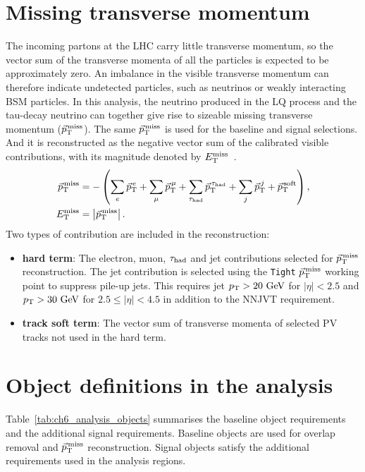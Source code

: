 \section{Missing transverse momentum}
\label{sec:ch6_met}

The incoming partons at the LHC carry little transverse momentum, so the vector sum of the transverse momenta of all the particles is expected to be approximately zero.
An imbalance in the visible transverse momentum can therefore indicate undetected particles, such as neutrinos or weakly interacting BSM particles.
In this analysis, the neutrino produced in the LQ process and the tau-decay neutrino can together give rise to sizeable missing transverse momentum ($\vec p_{\mathrm{T}}^{\,\mathrm{miss}}$). The same $\vec p_{\mathrm{T}}^{\,\mathrm{miss}}$ is used for the baseline and signal selections. And it is reconstructed as the negative vector sum of the calibrated visible contributions, with its magnitude denoted by $E_{\mathrm{T}}^{\mathrm{miss}}$~\cite{ATLAS2025METPerformance}. 
\begin{align*}
    \vec p_{\mathrm{T}}^{\,\mathrm{miss}}
    &=-\left(
    \sum_e\vec p_{\mathrm{T}}^{\,e}
    +\sum_\mu\vec p_{\mathrm{T}}^{\,\mu}
    +\sum_{\tau_{\mathrm{had}}}\vec p_{\mathrm{T}}^{\,\tau_{\mathrm{had}}}
    +\sum_j\vec p_{\mathrm{T}}^{\,j}
    +\vec p_{\mathrm{T}}^{\,\mathrm{soft}}
    \right),
    \\
    E_{\mathrm{T}}^{\mathrm{miss}}&=\left|\vec p_{\mathrm{T}}^{\,\mathrm{miss}}\right|.
\end{align*}
Two types of contribution are included in the reconstruction:
\begin{itemize}
    \item \textbf{hard term}: The electron, muon, $\tau_{\mathrm{had}}$ and jet contributions selected for $\vec p_{\mathrm{T}}^{\,\mathrm{miss}}$ reconstruction.
    The jet contribution is selected using the \texttt{Tight} $\vec p_{\mathrm{T}}^{\,\mathrm{miss}}$ working point to suppress pile-up jets.
    This requires jet $p_{\mathrm{T}}>20~\mathrm{GeV}$ for $|\eta|<2.5$ and $p_{\mathrm{T}}>30~\mathrm{GeV}$ for $2.5\leq|\eta|<4.5$ in addition to the NNJVT requirement.
    \item \textbf{track soft term}: The vector sum of transverse momenta of selected PV tracks not used in the hard term.
\end{itemize}

\section{Object definitions in the analysis}
\label{sec:ch6_analysis_objects}

Table~\ref{tab:ch6_analysis_objects} summarises the baseline object requirements and the additional signal requirements. Baseline objects are used for overlap removal and $\vec p_{\mathrm{T}}^{\,\mathrm{miss}}$ reconstruction. Signal objects satisfy the additional requirements used in the analysis regions.

